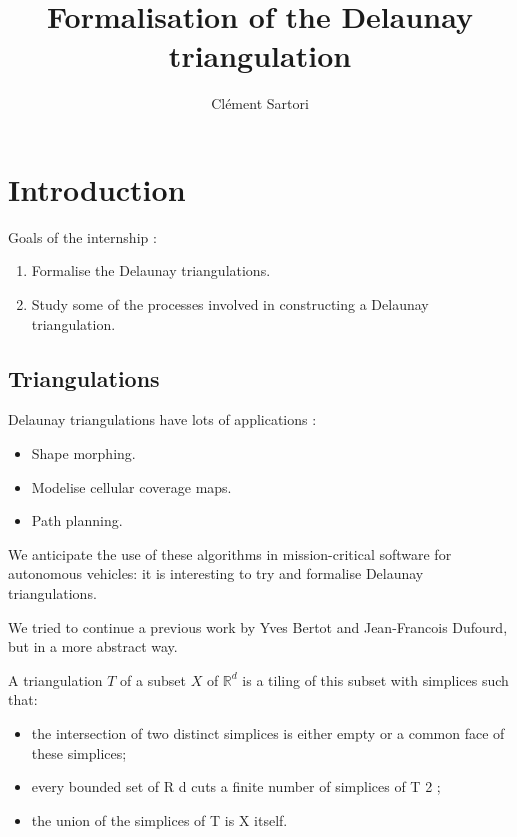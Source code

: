 \documentclass[handout]{beamer}
\begin{document}
\title{Formalisation of the Delaunay triangulation}
\author{Clément Sartori}
\begin{frame}
\maketitle
\end{frame}
\begin{frame}
 \tableofcontents
\end{frame}

\section{Introduction}

\begin{frame}
 Goals of the internship :
 \begin{enumerate}
  \item<1,2> Formalise the Delaunay triangulations.
  \item<2> Study some of the processes involved in constructing a Delaunay triangulation.
 \end{enumerate}

 
\end{frame}

\subsection{Triangulations}
\begin{frame}
 Delaunay triangulations have lots of applications :
 \begin{itemize}
  \item<1,2,3> Shape morphing.
  \item<2,3> Modelise cellular coverage maps.
  \item<3> Path planning.
 \end{itemize}
 
 We anticipate the use of these algorithms in mission-critical software for autonomous vehicles: it is interesting to try and formalise Delaunay triangulations.
 
 We tried to continue a previous work \cite{Bertot} by Yves Bertot and Jean-Francois Dufourd, but in a more abstract way.

\end{frame}

\begin{frame}
 
 A triangulation $T$ of a subset $X$ of $\mathbb{R}^d$ is a tiling of this subset with simplices such
that:
\begin{itemize}
 \item<1,2,3> the intersection of two distinct simplices is either empty or a common face of these simplices;
 \item<2,3> every bounded set of R d cuts a finite number of simplices of T 2 ;
 \item<3> the union of the simplices of T is X itself.
\end{itemize}


\end{frame}
\end{document}
